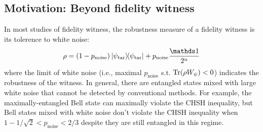 \documentclass[
aps,
pra,
twocolumn,
floatfix,
]{revtex4-2}
\theoremstyle{plain}
\newtheorem{theorem}{Theorem}
\theoremstyle{definition}
\newcommand{\ew}{W}
\newcommand{\dm}{\rho}
\newcommand{\ghz}{\text{GHZ}}
\newcommand{\target}{\textup{tar}}
\newcommand{\noise}{\text{noise}}
\newcommand{\D}{\mathcal{D}}
\begin{document}
\subsection{Motivation: Beyond fidelity witness}
In most studies of fidelity witness, the robustness measure of a fidelity witness is its tolerence to white noise:
\begin{equation}\label{eq:white_noise}
	\dm
	= (1-p_{\noise}) \op{\psi_{\target}} + p_{\noise} \frac{\identity}{2^{n}}
\end{equation}
where the limit of white noise (i.e., maximal $p_{\noise}$ s.t. $\Tr(\dm\ew_{\psi})<0$) indicates the robustness of the witness.
In general, there are entangled states mixed with large white noise that cannot be detected by conventional methods.
For example, the maximally-entangled Bell state can maximally violate the CHSH inequality, 
but Bell states mixed with white noise don't violate the CHSH inequality when $ 1- 1/ \sqrt{2} < p_{\noise}<2/3 $ despite they are still entangled in this regime.
\end{document}
